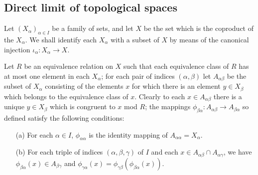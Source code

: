 \subsection{Direct limit of topological spaces}
Let $(X_\alpha)_{\alpha\in I}$ be a family of sets, and let $X$ be the set which is the coproduct of the $X_\alpha$. We shall identify each $X_\alpha$ with a subset of $X$ by means of the canonical injection $\iota_\alpha:X_\alpha\to X$.\par
Let $R$ be an equivalence relation on $X$ such that each equivalence class of $R$ has at most one element in each $X_\alpha$; for each pair of indices $(\alpha,\beta)$ let $A_{\alpha\beta}$ be the subset of $X_\alpha$ consisting of the elements $x$ for which there is an element $y\in X_{\beta}$ which belongs to the equivalence class of $x$. Clearly to each $x\in A_{\alpha\beta}$ there is a unique $y\in X_\beta$ which is congruent to $x$ mod $R$; the mappings $\phi_{\beta\alpha}:A_{\alpha\beta}\to A_{\beta\alpha}$ so defined satisfy the following conditions:
\begin{itemize}
\item[(a)] For each $\alpha\in I$, $\phi_{\alpha\alpha}$ is the identity mapping of $A_{\alpha\alpha}=X_\alpha$.
\item[(b)] For each triple of indices $(\alpha,\beta,\gamma)$ of $I$ and each $x\in A_{\alpha\beta}\cap A_{\alpha\gamma}$, we have $\phi_{\beta\alpha}(x)\in A_{\beta\gamma}$ and $\phi_{\gamma\alpha}(x)=\phi_{\gamma\beta}(\phi_{\beta\alpha}(x))$.
\end{itemize}

